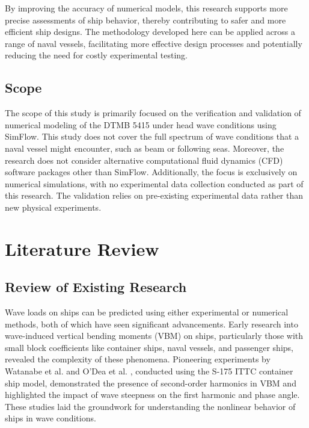 \documentclass[12pt]{article} %
\begin{document}
By improving the accuracy of numerical models, this research supports more precise assessments of 
ship behavior, thereby contributing to safer and more efficient ship designs. The methodology 
developed here can be applied across a range of naval vessels, facilitating more effective design 
processes and potentially reducing the need for costly experimental testing.

\subsection{Scope}

The scope of this study is primarily focused on the verification and validation of numerical 
modeling of the DTMB 5415 under head wave conditions using SimFlow. This study does not cover the full 
spectrum of wave conditions that a naval vessel might encounter, 
such as beam or following seas. Moreover, the research does not consider alternative computational 
fluid dynamics (CFD) software packages other than SimFlow. Additionally, the focus is exclusively on numerical 
simulations, with no experimental data collection conducted as part of this research. The validation 
relies on pre-existing experimental data rather than new physical experiments.



\section{Literature Review}

\subsection{Review of Existing Research}
Wave loads on ships can be predicted using either experimental or numerical methods, both of which 
have seen significant advancements. Early research into wave-induced vertical bending moments (VBM) 
on ships, particularly those with small block coefficients like container ships, naval vessels, and 
passenger ships, revealed the complexity of these phenomena. Pioneering experiments by Watanabe et 
al. \cite{Watanabe1989} and O'Dea et al. \cite{ODea1992}, conducted using the S-175 ITTC container 
ship model, demonstrated the presence of second-order harmonics in VBM and highlighted the impact of 
wave steepness on the first harmonic and phase angle. These studies laid the groundwork for 
understanding the nonlinear behavior of ships in wave conditions.
\end{document}
